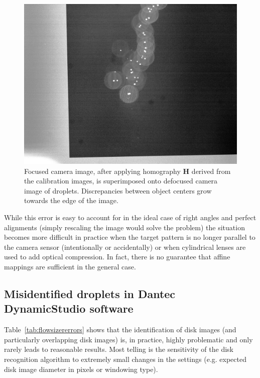 \documentclass[11.5pt,oneside]{book}
\newcommand*{\tableref}[1]{Table~\ref{#1}}
\begin{document}
\begin{figure}
    \centering
    \includegraphics[height=0.45\textheight]{img/orb/drop-calibration-off.jpg}
    \caption{Focused camera image, after applying homography $\mathbf{H}$
        derived from the calibration images, is superimposed onto
    defocused camera image of droplets. Discrepancies between object centers
grow towards the edge of the image.}
    \label{fig:drop-calibration-off}
\end{figure}

While this error is easy to account for in the ideal case of right angles and
perfect alignments (simply rescaling the image would solve the problem) the
situation becomes more difficult in practice when the target pattern is no longer
parallel to the camera sensor (intentionally or accidentally) or when
cylindrical lenses are used to add optical compression. In fact, there is no
guarantee that affine mappings are sufficient in the general case.

\subsection{Misidentified droplets in Dantec DynamicStudio software}
\tableref{tab:flowsizererrors} shows that the identification of disk images (and
particularly overlapping disk images) is, in practice, highly problematic and
only rarely leads to reasonable results. Most telling is the sensitivity of the
disk recognition algorithm to extremely small changes in the settings (e.g.
expected disk image diameter in pixels or windowing type).
\end{document}
